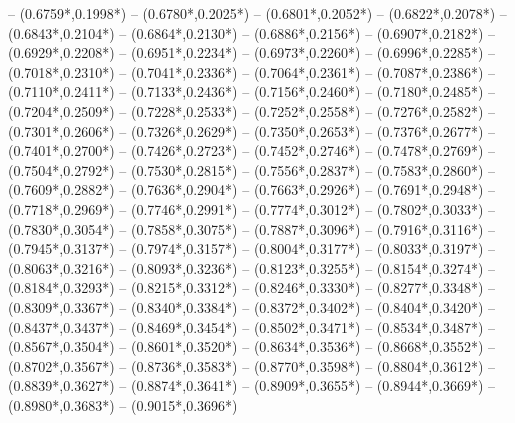 {	-- ({0.6759*\dx},{0.1998*\dy})
	-- ({0.6780*\dx},{0.2025*\dy})
	-- ({0.6801*\dx},{0.2052*\dy})
	-- ({0.6822*\dx},{0.2078*\dy})
	-- ({0.6843*\dx},{0.2104*\dy})
	-- ({0.6864*\dx},{0.2130*\dy})
	-- ({0.6886*\dx},{0.2156*\dy})
	-- ({0.6907*\dx},{0.2182*\dy})
	-- ({0.6929*\dx},{0.2208*\dy})
	-- ({0.6951*\dx},{0.2234*\dy})
	-- ({0.6973*\dx},{0.2260*\dy})
	-- ({0.6996*\dx},{0.2285*\dy})
	-- ({0.7018*\dx},{0.2310*\dy})
	-- ({0.7041*\dx},{0.2336*\dy})
	-- ({0.7064*\dx},{0.2361*\dy})
	-- ({0.7087*\dx},{0.2386*\dy})
	-- ({0.7110*\dx},{0.2411*\dy})
	-- ({0.7133*\dx},{0.2436*\dy})
	-- ({0.7156*\dx},{0.2460*\dy})
	-- ({0.7180*\dx},{0.2485*\dy})
	-- ({0.7204*\dx},{0.2509*\dy})
	-- ({0.7228*\dx},{0.2533*\dy})
	-- ({0.7252*\dx},{0.2558*\dy})
	-- ({0.7276*\dx},{0.2582*\dy})
	-- ({0.7301*\dx},{0.2606*\dy})
	-- ({0.7326*\dx},{0.2629*\dy})
	-- ({0.7350*\dx},{0.2653*\dy})
	-- ({0.7376*\dx},{0.2677*\dy})
	-- ({0.7401*\dx},{0.2700*\dy})
	-- ({0.7426*\dx},{0.2723*\dy})
	-- ({0.7452*\dx},{0.2746*\dy})
	-- ({0.7478*\dx},{0.2769*\dy})
	-- ({0.7504*\dx},{0.2792*\dy})
	-- ({0.7530*\dx},{0.2815*\dy})
	-- ({0.7556*\dx},{0.2837*\dy})
	-- ({0.7583*\dx},{0.2860*\dy})
	-- ({0.7609*\dx},{0.2882*\dy})
	-- ({0.7636*\dx},{0.2904*\dy})
	-- ({0.7663*\dx},{0.2926*\dy})
	-- ({0.7691*\dx},{0.2948*\dy})
	-- ({0.7718*\dx},{0.2969*\dy})
	-- ({0.7746*\dx},{0.2991*\dy})
	-- ({0.7774*\dx},{0.3012*\dy})
	-- ({0.7802*\dx},{0.3033*\dy})
	-- ({0.7830*\dx},{0.3054*\dy})
	-- ({0.7858*\dx},{0.3075*\dy})
	-- ({0.7887*\dx},{0.3096*\dy})
	-- ({0.7916*\dx},{0.3116*\dy})
	-- ({0.7945*\dx},{0.3137*\dy})
	-- ({0.7974*\dx},{0.3157*\dy})
	-- ({0.8004*\dx},{0.3177*\dy})
	-- ({0.8033*\dx},{0.3197*\dy})
	-- ({0.8063*\dx},{0.3216*\dy})
	-- ({0.8093*\dx},{0.3236*\dy})
	-- ({0.8123*\dx},{0.3255*\dy})
	-- ({0.8154*\dx},{0.3274*\dy})
	-- ({0.8184*\dx},{0.3293*\dy})
	-- ({0.8215*\dx},{0.3312*\dy})
	-- ({0.8246*\dx},{0.3330*\dy})
	-- ({0.8277*\dx},{0.3348*\dy})
	-- ({0.8309*\dx},{0.3367*\dy})
	-- ({0.8340*\dx},{0.3384*\dy})
	-- ({0.8372*\dx},{0.3402*\dy})
	-- ({0.8404*\dx},{0.3420*\dy})
	-- ({0.8437*\dx},{0.3437*\dy})
	-- ({0.8469*\dx},{0.3454*\dy})
	-- ({0.8502*\dx},{0.3471*\dy})
	-- ({0.8534*\dx},{0.3487*\dy})
	-- ({0.8567*\dx},{0.3504*\dy})
	-- ({0.8601*\dx},{0.3520*\dy})
	-- ({0.8634*\dx},{0.3536*\dy})
	-- ({0.8668*\dx},{0.3552*\dy})
	-- ({0.8702*\dx},{0.3567*\dy})
	-- ({0.8736*\dx},{0.3583*\dy})
	-- ({0.8770*\dx},{0.3598*\dy})
	-- ({0.8804*\dx},{0.3612*\dy})
	-- ({0.8839*\dx},{0.3627*\dy})
	-- ({0.8874*\dx},{0.3641*\dy})
	-- ({0.8909*\dx},{0.3655*\dy})
	-- ({0.8944*\dx},{0.3669*\dy})
	-- ({0.8980*\dx},{0.3683*\dy})
	-- ({0.9015*\dx},{0.3696*\dy})
}
